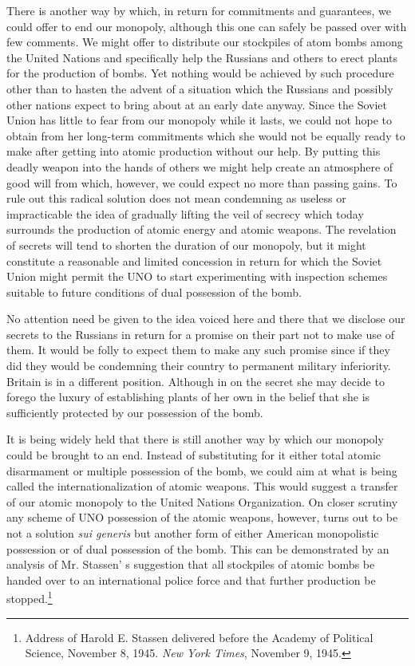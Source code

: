 There is another way by which, in return for commitments and guarantees, we could offer to end our monopoly, although this one can safely be passed over with few comments. We might offer to distribute our stockpiles of atom bombs among the United Nations and specifically help the Russians and others to erect plants for the production of bombs. Yet nothing would be achieved by such procedure other than to hasten the advent of a situation which the Russians and possibly other nations expect to bring about at an early date anyway. Since the Soviet Union has little to fear from our monopoly while it lasts, we could not hope to obtain from her long-term commitments which she would not be equally ready to make after getting into atomic production without our help. By putting this deadly weapon into the hands of others we might help create an atmosphere of good will from which, however, we could expect no more than passing gains. To rule out this radical solution does not mean condemning as useless or impracticable the idea of gradually lifting the veil of secrecy which today surrounds the production of atomic energy and atomic weapons. The revelation of secrets will tend to shorten the duration of our monopoly, but it might constitute a reasonable and limited concession in return for which the Soviet Union might permit the UNO to start experimenting with inspection schemes suitable to future conditions of dual possession of the bomb.

No attention need be given to the idea voiced here and there that we disclose our secrets to the Russians in return for a promise on their part not to make use of them. It would be folly to expect them to make any such promise since if they did they would be condemning their country to permanent military inferiority. Britain is in a different position. Although in on the secret she may decide to forego the luxury of establishing plants of her own in the belief that she is sufficiently protected by our possession of the bomb.

It is being widely held that there is still another way by which our monopoly could be brought to an end. Instead of substituting for it either total atomic disarmament or multiple possession of the bomb, we could aim at what is being called the internationalization of atomic weapons. This would suggest a transfer of our atomic monopoly to the United Nations Organization. On closer scrutiny any scheme of UNO possession of the atomic weapons, however, turns out to be not a solution \emph{sui generis} but another form of either American monopolistic possession or of dual possession of the bomb. This can be demonstrated by an analysis of Mr. Stassen' s suggestion that all stockpiles of atomic bombs be handed over to an international police force and that further production be stopped.\footnote{Address of Harold E. Stassen delivered before the Academy of Political Science, November 8, 1945. \textit{New York Times}, November 9, 1945.}

